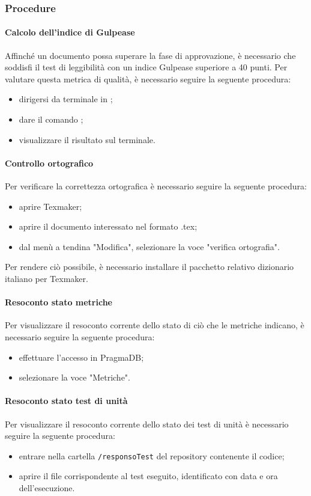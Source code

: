 \subsubsection{Procedure}
\paragraph{Calcolo dell'indice di Gulpease}
Affinché un documento possa superare la fase di approvazione, è necessario che soddisfi il test di leggibilità con un indice Gulpease superiore a 40 punti. Per valutare questa metrica di qualità, è necessario seguire la seguente procedura:
\begin{itemize}
	\item dirigersi da terminale in \GulScript{};
	\item dare il comando ;
	\item visualizzare il risultato sul terminale.
\end{itemize}
\paragraph{Controllo ortografico}
Per verificare la correttezza ortografica è necessario seguire la seguente procedura:
\begin{itemize}
	\item aprire Texmaker;
	\item aprire il documento interessato nel formato .tex;
	\item dal menù a tendina "Modifica", selezionare la voce "verifica ortografia".
\end{itemize}
Per rendere ciò possibile, è necessario installare il pacchetto relativo dizionario italiano per Texmaker.
\paragraph{Resoconto stato metriche}
Per visualizzare il resoconto corrente dello stato di ciò che le metriche indicano, è necessario seguire la seguente procedura:
\begin{itemize}
	\item effettuare l'accesso in PragmaDB;
	\item selezionare la voce "Metriche".
\end{itemize}
\paragraph{Resoconto stato test di unità}
Per visualizzare il resoconto corrente dello stato dei test di unità è necessario seguire la seguente procedura:
\begin{itemize}
	\item entrare nella cartella \texttt{/responsoTest} del repository contenente il codice;
	\item aprire il file corrispondente al test eseguito, identificato con data e ora dell'esecuzione.
\end{itemize}
